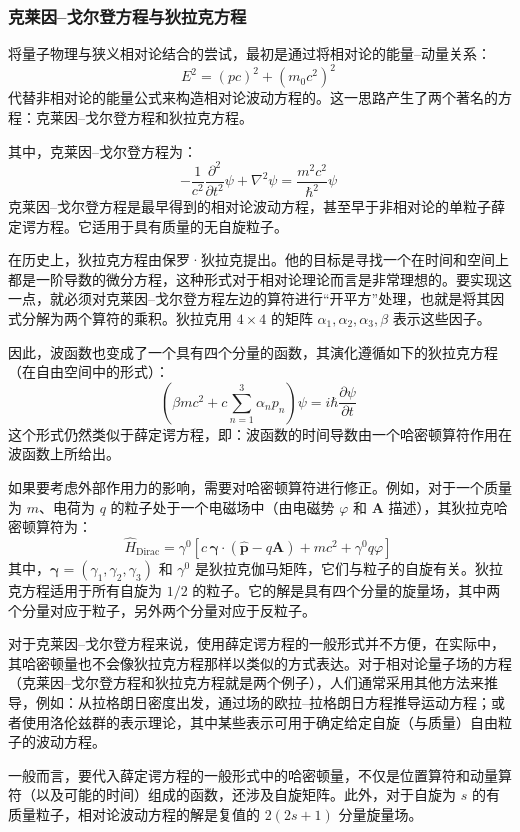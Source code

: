 \subsubsection{克莱因–戈尔登方程与狄拉克方程}
将量子物理与狭义相对论结合的尝试，最初是通过将相对论的能量–动量关系：
$$
E^2 = (pc)^2 + (m_0 c^2)^2~
$$
代替非相对论的能量公式来构造相对论波动方程的。这一思路产生了两个著名的方程：克莱因–戈尔登方程和狄拉克方程。

其中，克莱因–戈尔登方程为：
$$
-\frac{1}{c^2} \frac{\partial^2}{\partial t^2} \psi + \nabla^2 \psi = \frac{m^2 c^2}{\hbar^2} \psi~
$$
克莱因–戈尔登方程是最早得到的相对论波动方程，甚至早于非相对论的单粒子薛定谔方程。它适用于具有质量的无自旋粒子。

在历史上，狄拉克方程由保罗·狄拉克提出。他的目标是寻找一个在时间和空间上都是一阶导数的微分方程，这种形式对于相对论理论而言是非常理想的。要实现这一点，就必须对克莱因–戈尔登方程左边的算符进行“开平方”处理，也就是将其因式分解为两个算符的乘积。狄拉克用 $4 \times 4$ 的矩阵 $\alpha_1, \alpha_2, \alpha_3, \beta$ 表示这些因子。

因此，波函数也变成了一个具有四个分量的函数，其演化遵循如下的狄拉克方程（在自由空间中的形式）：
$$
\left( \beta m c^2 + c \sum_{n=1}^3 \alpha_n p_n \right) \psi = i \hbar \frac{\partial \psi}{\partial t}~
$$
这个形式仍然类似于薛定谔方程，即：波函数的时间导数由一个哈密顿算符作用在波函数上所给出。

如果要考虑外部作用力的影响，需要对哈密顿算符进行修正。例如，对于一个质量为 $m$、电荷为 $q$ 的粒子处于一个电磁场中（由电磁势 $\varphi$ 和 $\mathbf{A}$ 描述），其狄拉克哈密顿算符为：
$$
\hat{H}_{\text{Dirac}} = \gamma^0 \left[ c\, \boldsymbol{\gamma} \cdot (\hat{\mathbf{p}} - q \mathbf{A}) + m c^2 + \gamma^0 q \varphi \right]~
$$
其中，$\boldsymbol{\gamma} = (\gamma_1, \gamma_2, \gamma_3)$ 和 $\gamma^0$ 是狄拉克伽马矩阵，它们与粒子的自旋有关。狄拉克方程适用于所有自旋为 $1/2$ 的粒子。它的解是具有四个分量的旋量场，其中两个分量对应于粒子，另外两个分量对应于反粒子。

对于克莱因–戈尔登方程来说，使用薛定谔方程的一般形式并不方便，在实际中，其哈密顿量也不会像狄拉克方程那样以类似的方式表达。对于相对论量子场的方程（克莱因–戈尔登方程和狄拉克方程就是两个例子），人们通常采用其他方法来推导，例如：从拉格朗日密度出发，通过场的欧拉–拉格朗日方程推导运动方程；或者使用洛伦兹群的表示理论，其中某些表示可用于确定给定自旋（与质量）自由粒子的波动方程。

一般而言，要代入薛定谔方程的一般形式中的哈密顿量，不仅是位置算符和动量算符（以及可能的时间）组成的函数，还涉及自旋矩阵。此外，对于自旋为 $s$ 的有质量粒子，相对论波动方程的解是复值的 $2(2s+1)$ 分量旋量场。
